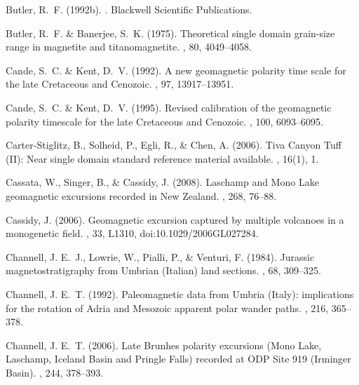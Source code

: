 \documentclass[11pt]{book}
\begin{document}
\begin{thebibliography}{}
Butler, R.~F. (1992b).
.
\newblock Blackwell Scientific Publications.

Butler, R.~F. \& Banerjee, S.~K. (1975).
\newblock Theoretical single domain grain-size range in magnetite and
  titanomagnetite.
, 80, 4049--4058.

Cande, S.~C. \& Kent, D.~V. (1992).
\newblock A new geomagnetic polarity time scale for the late Cretaceous and
  Cenozoic.
, 97, 13917--13951.

Cande, S.~C. \& Kent, D.~V. (1995).
\newblock Revised calibration of the geomagnetic polarity timescale for the
  late Cretaceous and Cenozoic.
, 100, 6093--6095.

Carter-Stiglitz, B., Solheid, P., Egli, R., \& Chen, A. (2006).
\newblock Tiva Canyon Tuff (II): Near single domain standard reference material
  available.
, 16(1), 1.

Cassata, W., Singer, B., \& Cassidy, J. (2008).
\newblock Laschamp and Mono Lake geomagnetic excursions recorded in New
  Zealand.
, 268, 76--88.

Cassidy, J. (2006).
\newblock Geomagnetic excursion captured by multiple volcanoes in a monogenetic
  field.
, 33, L1310, doi:10.1029/2006GL027284.

Channell, J. E.~J., Lowrie, W., Pialli, P., \& Venturi, F. (1984).
\newblock Jurassic magnetostratigraphy from Umbrian (Italian) land sections.
, 68, 309--325.

Channell, J. E.~T. (1992).
\newblock Paleomagnetic data from Umbria (Italy): implications for the rotation
  of Adria and Mesozoic apparent polar wander paths.
, 216, 365--378.

Channell, J. E.~T. (2006).
\newblock Late Brunhes polarity excursions (Mono Lake, Laschamp, Iceland Basin
  and Pringle Falls) recorded at ODP Site 919 (Irminger Basin).
, 244, 378--393.


\end{thebibliography}
\end{document}
